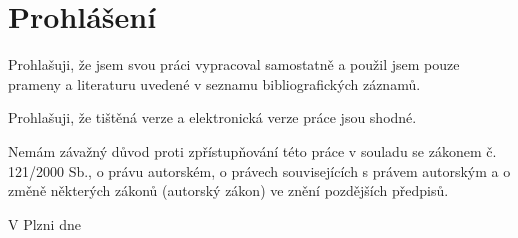 \section*{Prohlášení}

Prohlašuji, že jsem svou práci vypracoval samostatně a použil jsem pouze prameny
a literaturu uvedené v seznamu bibliografických záznamů.

Prohlašuji, že tištěná verze a elektronická verze práce jsou shodné.

Nemám závažný důvod proti zpřístupňování této práce v souladu se zákonem č.
121/2000 Sb., o právu autorském, o právech souvisejících s právem autorským a o
změně některých zákonů (autorský zákon) ve znění pozdějších předpisů.

V Plzni dne
